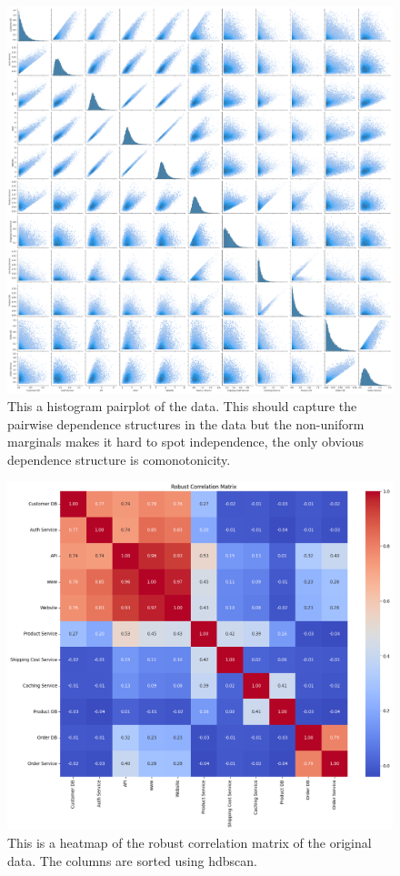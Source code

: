 \documentclass[a4paper,12pt]{article}
\begin{document}
\begin{figure}[h]
    \centering
    \includegraphics[width=\textwidth]{../copula example/pairplotraw.png}
    \caption{ This a histogram pairplot of the data. This should capture the pairwise dependence structures in the data
        but the non-uniform marginals makes it hard to spot independence, the only obvious dependence structure is
        comonotonicity.}
    \label{fig:rawpairplot}
\end{figure}

\begin{figure}[h]
    \centering
    \includegraphics[width=\textwidth]{../copula example/robust_correlation.png}
    \caption{
        This is a heatmap of the robust correlation matrix of the original data. The columns are sorted
        using hdbscan.
    }
    \label{fig:robust correlation}
\end{figure}
\end{document}
